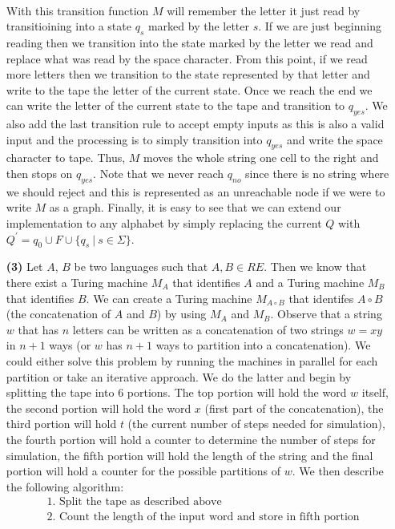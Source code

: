 \documentclass [10pt]{article}
\begin{document}
\begin{enumerate}
\begin{align}
	\end{align}
	With this transition function $M$ will remember the letter it just read by transitioining into a state $q_{s}$ marked by the letter $s$. If we are just beginning reading then we transition into the state marked by the letter we read and replace what was read by the space character. From this point, if we read more letters then we transition to the state represented by that letter and write to the tape the letter of the current state. Once we reach the end we can write the letter of the current state to the tape and transition to $q_{yes}$. We also add the last transition rule to accept empty inputs as this is also a valid input and the processing is to simply transition into $q_{yes}$ and write the space character to tape. Thus, $M$ moves the whole string one cell to the right and then stops on $q_{yes}$. Note that we never reach $q_{no}$ since there is no string where we should reject and this is represented as an unreachable node if we were to write $M$ as a graph. Finally, it is easy to see that we can extend our implementation to any alphabet by simply replacing the current $Q$ with $Q^{\prime}={q_{0}}\cup F\cup \{q_{s}\:|\:s\in\Sigma\}$.
	\item[\textbf{(3)}]Let $A$, $B$ be two languages such that $A, B\in RE$. Then we know that there exist a Turing machine $M_{A}$ that identifies $A$ and a Turing machine $M_{B}$ that identifies $B$. We can create a Turing machine $M_{A\circ B}$ that identifes $A\circ B$ (the concatenation of $A$ and $B$) by using $M_{A}$ and $M_{B}$. Observe that a string $w$ that has $n$ letters can be written as a concatenation of two strings $w=xy$ in $n+1$ ways (or $w$ has $n+1$ ways to partition into a concatenation). We could either solve this problem by running the machines in parallel for each partition or take an iterative approach. We do the latter and begin by splitting the tape into $6$ portions. The top portion will hold the word $w$ itself, the second portion will hold the word $x$ (first part of the concatenation), the third portion will hold $t$ (the current number of steps needed for simulation), the fourth portion will hold a counter to determine the number of steps for simulation, the fifth portion will hold the length of the string and the final portion will hold a counter for the possible partitions of $w$. We then describe the following algorithm:
	\begin{align}
		&\text{1. Split the tape as described above}\nonumber\\
		&\text{2. Count the length of the input word and store in fifth portion}\nonumber\\

\end{align}
\end{enumerate}
\end{document}
